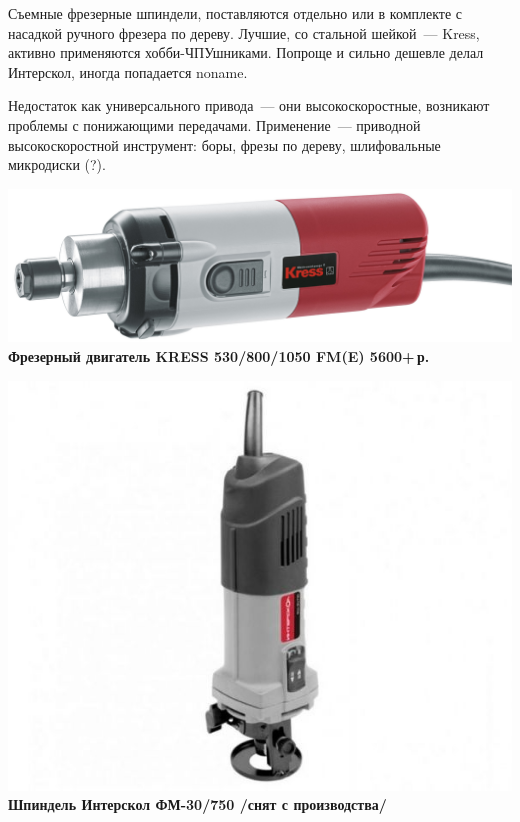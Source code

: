 \documentclass{magazine}
\begin{document}
\begin{multicols}{2}
\bigskip
Съемные фрезерные шпиндели, поставляются отдельно или в комплекте с
насадкой ручного фрезера по дереву. Лучшие, со стальной шейкой\ --- Kress,
активно применяются хобби-ЧПУшниками. Попроще и сильно дешевле делал Интерскол,
иногда попадается noname.

Недостаток как универсального привода\ --- они высокоскоростные,
возникают проблемы с понижающими передачами. Применение\ --- приводной
высокоскоростной инструмент: боры, фрезы по дереву, шлифовальные микродиски (?).

\noindent\href{http://kress-shop.ru/product/frezernyj-dvigatel-530-fm-kress-06082302/}{
\includegraphics[width=\columnwidth]{fig/00/Kress530.jpg}}
\textbf{Фрезерный двигатель KRESS 530/800/1050 FM(E) 5600+\,р.}

\noindent\includegraphics[width=\columnwidth]{fig/00/Interskol30.jpg}
\textbf{Шпиндель Интерскол ФМ-30/750 /снят с производства/}


\end{multicols}
\end{document}

